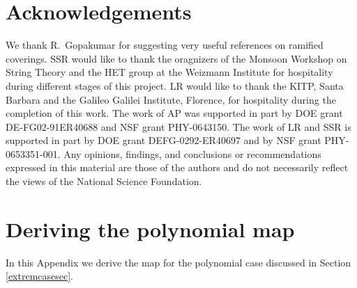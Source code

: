 \documentclass[letterpaper]{JHEP3}
\begin{document}
\section*{Acknowledgements}
We thank R.~Gopakumar for suggesting very useful references on ramified coverings.
SSR would like to thank the oragnizers of the Monsoon Workshop on String Theory and the HET group at
 the Weizmann Institute for hospitality during
different stages of this project. LR would like to thank the KITP, Santa Barbara and the Galileo Galilei Institute, Florence,
for hospitality during the completion of this work.
The work of AP was supported in part by DOE grant DE-FG02-91ER40688 and
NSF grant PHY-0643150. The work of LR and SSR is supported in part by DOE
grant  DEFG-0292-ER40697
and by  NSF grant PHY-0653351-001.  Any opinions, findings, and conclusions or recommendations
expressed in this material are those of the authors and do not necessarily reflect  the views of the National Science Foundation. 




\appendix

%
\section{Deriving the polynomial map}\label{details}


In this Appendix we derive the map for the polynomial case discussed in Section \ref{extremcasesec}.
\end{document}
